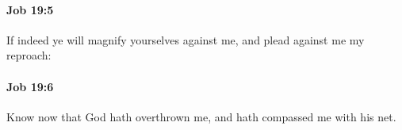 		\paragraph{Job 19:5} %
			\label{JOB-19-5}

			If indeed ye will magnify yourselves against me, and plead against me my reproach:


		\paragraph{Job 19:6} %
			\label{JOB-19-6}

			Know now that God hath overthrown me, and hath compassed me with his net.


